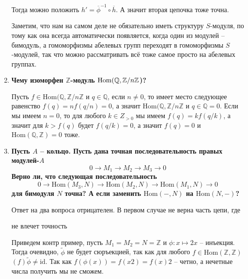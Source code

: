 \documentclass{article}
\begin{document}
\begin{enumerate}
        Тогда можно положить $h'=\overline\phi^{-1}\circ\overline h$. А значит
        вторая цепочка тоже точна.

        Заметим, что нам на самом деле не обязательно иметь структуру $S$-модуля,
        по тому как она всегда автоматически появляется, когда один из модулей –
        бимодуль, а гомоморфизмы абелевых групп переходят в гомоморфизмы $S$-модулей,
        так что можно рассматривать всё тоже самое просто на абелевых группах.

    \item \textbf{Чему изоморфен $\mathbb{Z}$-модуль $\textnormal{Hom}(\mathbb{Q}, \mathbb{Z}/n\mathbb{Z}$)?}

        Пусть $f\in \text{Hom}(\mathbb{Q}, \mathbb{Z}/n\mathbb{Z}$ и $q\in\mathbb{Q}$, если $n\neq 0$, то
        имеет место следующее равенство $f(q)=nf(q/n)=0$, а значит $\text{Hom}(\mathbb{Q}, \mathbb{Z}/n\mathbb{Z}$ и $q\in\mathbb{Q} = 0$.
        Если мы имеем $n=0$, то для любого $k\in Z_{>0}$ мы имеем $f(q) = kf(q/k)$, а значит для $k>f(q)$ будет
        $f(q/k)=0$, а значит $f(q)=0$ и $\text{Hom}(\mathbb{Q}, \mathbb{Z})=0$ тоже.

    \item \textbf{Пусть $A$ – кольцо. Пусть дана точная последовательность правых модулей-$A$}
        \[0\rightarrow M_1\rightarrow M_2\rightarrow M_3\rightarrow 0\]
        \textbf{Верно ли, что следующая последовательность}
        \[0\rightarrow\text{Hom}(M_3,N)\rightarrow\text{Hom}(M_2,N)\rightarrow\text{Hom}(M_1,N)\rightarrow 0\]
        \textbf{для бимодуля $N$ точна? А если заменить $\text{Hom}(−,N)$ на $\text{Hom}(N,−)$?}

        Ответ на два вопроса отрицателен. В первом случае не верна часть цепи, где
        \begin{center}\end{center}
        не влечет точность
        \begin{center}\end{center}

        Приведем контр пример, пусть $M_1=M_2=N=\mathbb{Z}$ и $\phi:x\mapsto2x$ – инъекция. Тогда очевидно, 
        $\widetilde\phi$ не будет сюръекцией, так как для любого $f\in\text{Hom}(\mathbb{Z},\mathbb{Z})$
        $(f)\widetilde\phi\neq\text{id}$. Так как $f(\phi(x))=f(x2)=f(x)2$ – четно, а нечетные числа получить
        мы не сможем.


\end{enumerate}
\end{document}

